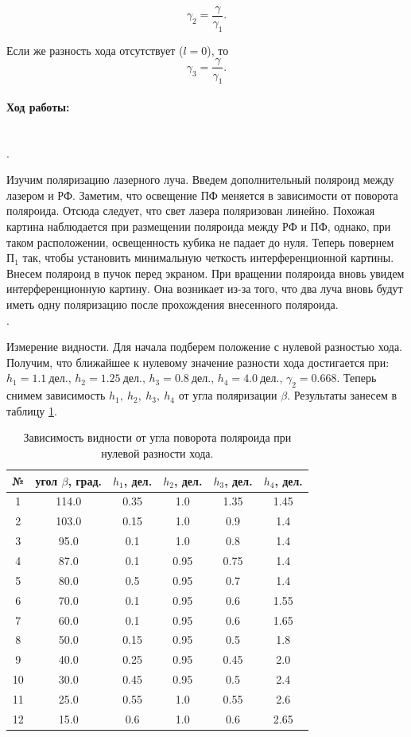 \documentclass[a4paper, 12pt]{article}
\newcommand{\parag}[1]{\paragraph*{#1:}}
\newcounter{Points}
\newcommand{\point}{\arabic{Points}. \addtocounter{Points}{1}}
\begin{document}
\begin{equation}
    \gamma_2 = \dfrac{\gamma}{\gamma_1}.
\end{equation}

Если же разность хода отсутствует ($l = 0$), то
\begin{equation}
    \gamma_3 = \dfrac{\gamma}{\gamma_1}.
\end{equation}

\parag {Ход работы} ~\\

\point Изучим поляризацию лазерного луча. Введем дополнительный поляроид между лазером и РФ. Заметим, что освещение ПФ меняется в зависимости от поворота поляроида. Отсюда следует, что свет лазера поляризован линейно. Похожая картина наблюдается при размещении поляроида между РФ и ПФ, однако, при таком расположении, освещенность кубика не падает до нуля. Теперь повернем $П_1$ так, чтобы установить минимальную четкость интерференционной картины. Внесем поляроид в пучок перед экраном. При вращении поляроида вновь увидем интерференционную картину. Она возникает из-за того, что два луча вновь будут иметь одну поляризацию после прохождения внесенного поляроида. \\


\point Измерение видности. Для начала подберем положение с нулевой разностью хода. Получим, что ближайшее к нулевому значение разности хода достигается при: $h_1 = 1.1 ~ дел.$, $h_2 = 1.25 ~ дел.$, $h_3 = 0.8 ~ дел.$, $h_4 = 4.0 ~ дел.$, $\gamma_2 = 0.668$. Теперь снимем зависимость $h_1, ~ h_2, ~ h_3, ~ h_4$ от угла поляризации $\beta$. Результаты занесем в таблицу \ref{tabl:b_to_h}.


\begin{table}[h]
\centering
\begin{tabular}{|c|c|c|c|c|c|}
\hline 
    № & угол $\beta$, град. & $h_1$, дел.  & $h_2$, дел.  & $h_3$, дел.  & $h_4$, дел. \\ \hline
    1 & 114.0 & 0.35 & 1.0 & 1.35 & 1.45 \\ \hline
    2 & 103.0 & 0.15 & 1.0 & 0.9 & 1.4 \\ \hline
    3 & 95.0 & 0.1 & 1.0 & 0.8 & 1.4 \\ \hline
    4 & 87.0 & 0.1 & 0.95 & 0.75 & 1.4 \\ \hline
    5 & 80.0 & 0.5 & 0.95 & 0.7 & 1.4 \\ \hline
    6 & 70.0 & 0.1 & 0.95 & 0.6 & 1.55 \\ \hline
    7 & 60.0 & 0.1 & 0.95 & 0.6 & 1.65 \\ \hline
    8 & 50.0 & 0.15 & 0.95 & 0.5 & 1.8 \\ \hline
    9 & 40.0 & 0.25 & 0.95 & 0.45 & 2.0 \\ \hline
    10 & 30.0 & 0.45 & 0.95 & 0.5 & 2.4 \\ \hline
    11 & 25.0 & 0.55 & 1.0 & 0.55 & 2.6 \\ \hline
    12 & 15.0 & 0.6 & 1.0 & 0.6 & 2.65 \\ \hline
\end{tabular}
\caption{Зависимость видности от угла поворота поляроида при нулевой разности хода.}
\label{tabl:b_to_h}
\end{table}
\end{document}
